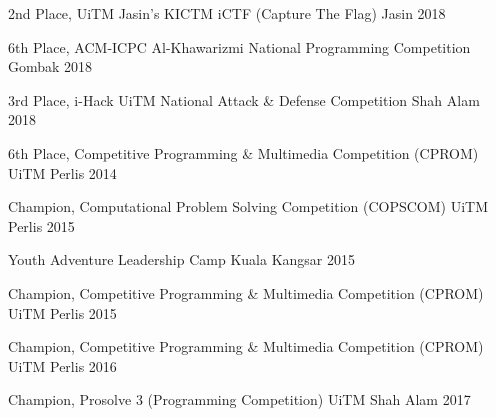 \begin{cvhonors}
  \cvhonor
    {2nd Place,}
    {UiTM Jasin's KICTM iCTF (Capture The Flag) }
    {Jasin}
    {2018}

  \cvhonor
    {6th Place,}
    {ACM-ICPC Al-Khawarizmi National Programming Competition}
    {Gombak}
    {2018}

  \cvhonor
    {3rd Place,}
    {i-Hack UiTM National Attack \& Defense Competition}
    {Shah Alam}
    {2018}

\end{cvhonors}


\begin{cvhonors}

  \cvhonor
    {6th Place,}
    {Competitive Programming \& Multimedia Competition (CPROM)}
    {UiTM Perlis}
    {2014}

  \cvhonor
    {Champion,}
    {Computational Problem Solving Competition (COPSCOM)}
    {UiTM Perlis}
    {2015}

  \cvhonor
    {}
    {Youth Adventure Leadership Camp}
    {Kuala Kangsar}
    {2015}

  \cvhonor
    {Champion,}
    {Competitive Programming \& Multimedia Competition (CPROM)}
    {UiTM Perlis}
    {2015}
        
  \cvhonor
    {Champion,}
    {Competitive Programming \& Multimedia Competition (CPROM)}
    {UiTM Perlis}
    {2016}

  \cvhonor
    {Champion,}
    {Prosolve 3 (Programming Competition)}
    {UiTM Shah Alam}
    {2017}

\end{cvhonors}
